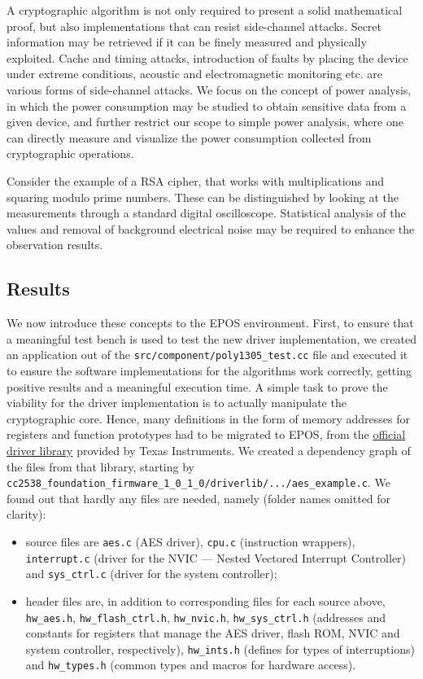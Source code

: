 \documentclass{../sftex/sftex}
\begin{document}
A cryptographic algorithm is not only required to present a solid mathematical
proof, but also implementations that can resist side-channel attacks. Secret
information may be retrieved if it can be finely measured and physically
exploited. Cache and timing attacks, introduction of faults by placing the
device under extreme conditions, acoustic and electromagnetic monitoring etc.
are various forms of side-channel attacks. We focus on the concept of power
analysis, in which the power consumption may be studied to obtain sensitive
data from a given device, and further restrict our scope to simple power
analysis, where one can directly measure and visualize the power consumption
collected from cryptographic operations.

Consider the example of a RSA cipher, that works with multiplications and
squaring modulo prime numbers. These can be distinguished by looking at the
measurements through a standard digital oscilloscope. Statistical analysis of
the values and removal of background electrical noise may be required to
enhance the observation results.

\subsection{Results}

We now introduce these concepts to the EPOS environment. First, to ensure that
a meaningful test bench is used to test the new driver implementation, we
created an application out of the \verb!src/component/poly1305_test.cc! file
and executed it to ensure the software implementations for the algorithms work
correctly, getting positive results and a meaningful execution time. A simple
task to prove the viability for the driver implementation is to actually
manipulate the cryptographic core. Hence, many definitions in the form of
memory addresses for registers and function prototypes had to be migrated to
EPOS, from the \href{http://www.ti.com/tool/CC2538-SW}{official driver library}
provided by Texas Instruments. We created a dependency graph of the files from
that library, starting by
\verb!cc2538_foundation_firmware_1_0_1_0/driverlib/.../aes_example.c!. We found
out that hardly any files are needed, namely (folder names omitted for
clarity):

\begin{itemize}
  \item source files are \verb!aes.c! (AES driver), \verb!cpu.c! (instruction
      wrappers), \verb!interrupt.c! (driver for the NVIC --- Nested Vectored
        Interrupt Controller) and \verb!sys_ctrl.c! (driver for the system
        controller);
  \item header files are, in addition to corresponding files for each source
      above, \verb!hw_aes.h!, \verb!hw_flash_ctrl.h!, \verb!hw_nvic.h!,
        \verb!hw_sys_ctrl.h! (addresses and constants for registers that manage
        the AES driver, flash ROM, NVIC and system controller, respectively),
        \verb!hw_ints.h! (defines for types of interruptions) and
        \verb!hw_types.h! (common types and macros for hardware access).
\end{itemize}
\end{document}
